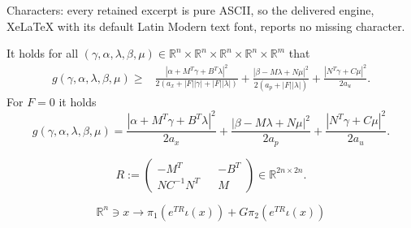 \documentclass[10pt,a4paper]{amsart}
\newcommand{\R}{\mathbb R}
\begin{document}
Characters: every retained excerpt is pure ASCII, so the delivered engine, XeLaTeX with its default Latin Modern text font, reports no missing character.
\begin{proposition}\label{prop: lb g}
    It holds for all $(\gamma,\alpha,\lambda,\beta,\mu) \in \R^n \times \R^n \times \R^n \times \R^n \times \R^m$ that
    \begin{align*}
    g(\gamma,\alpha,\lambda,\beta,\mu) \geq &\frac{\left| \alpha + M^T \gamma + B^T \lambda \right|^2}{2 (a_x + |F| |\gamma| + |F| |\lambda|)}  + \frac{\left| \beta - M \lambda + N \mu \right|^2}{2 ( a_p + |F| |\lambda|)}  + \frac{\left| N^T \gamma + C \mu \right|^2}{2a_u} .
    \end{align*}
    For $F = 0$ it holds 
    \[
        g(\gamma,\alpha,\lambda,\beta,\mu) = \frac{\left| \alpha + M^T \gamma + B^T \lambda \right|^2}{2 a_x}  + \frac{\left| \beta - M \lambda + N \mu \right|^2}{2  a_p }  + \frac{\left| N^T \gamma + C \mu \right|^2}{2a_u} .
    \]
\end{proposition}

\begin{equation}\label{eq: defR}
R := \begin{pmatrix} -M^T && - B^T \\ N C^{-1}N^T &&  M \end{pmatrix} \in \R^{2n \times 2n}.
\end{equation}

\begin{equation} \label{eq: invert}
\R^n \ni x \rightarrow \pi_1 (e^{TR}  \iota(x)) + G \pi_2 (e^{TR} \iota(x)) 
\end{equation}
\end{document}
